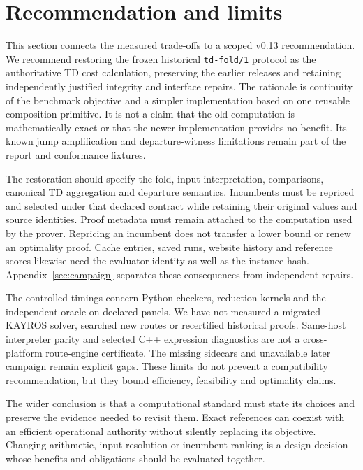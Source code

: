 \documentclass[11pt]{article}
\newcommand{\contractone}{\texttt{td-fold/1}}
\begin{document}
\section{Recommendation and limits}\label{sec:recommendation}

This section connects the measured trade-offs to a scoped v0.13 recommendation. We recommend restoring the frozen historical \contractone{} protocol as the authoritative TD cost calculation, preserving the earlier releases and retaining independently justified integrity and interface repairs. The rationale is continuity of the benchmark objective and a simpler implementation based on one reusable composition primitive. It is not a claim that the old computation is mathematically exact or that the newer implementation provides no benefit. Its known jump amplification and departure-witness limitations remain part of the report and conformance fixtures.

The restoration should specify the fold, input interpretation, comparisons, canonical TD aggregation and departure semantics. Incumbents must be repriced and selected under that declared contract while retaining their original values and source identities. Proof metadata must remain attached to the computation used by the prover. Repricing an incumbent does not transfer a lower bound or renew an optimality proof. Cache entries, saved runs, website history and reference scores likewise need the evaluator identity as well as the instance hash. Appendix~\ref{sec:campaign} separates these consequences from independent repairs.



The controlled timings concern Python checkers, reduction kernels and the independent oracle on declared panels. We have not measured a migrated KAYROS solver, searched new routes or recertified historical proofs. Same-host interpreter parity and selected C++ expression diagnostics are not a cross-platform route-engine certificate. The missing sidecars and unavailable later campaign remain explicit gaps. These limits do not prevent a compatibility recommendation, but they bound efficiency, feasibility and optimality claims.

The wider conclusion is that a computational standard must state its choices and preserve the evidence needed to revisit them. Exact references can coexist with an efficient operational authority without silently replacing its objective. Changing arithmetic, input resolution or incumbent ranking is a design decision whose benefits and obligations should be evaluated together.
\end{document}
